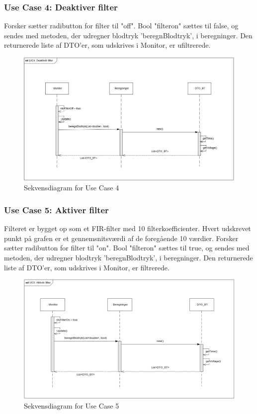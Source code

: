 \subsubsection{Use Case 4: Deaktiver filter}
Forsker sætter radibutton for filter til "off".
Bool "filteron" sættes til false, og sendes med metoden, der udregner blodtryk 'beregnBlodtryk', i beregninger. Den returnerede liste af DTO'er, som udskrives i Monitor, er ufiltrerede.

\begin{figure}[H]
	\centering
	\includegraphics[width=1\textwidth]{Figurer/UC4_SD_SW}
	\caption{Sekvensdiagram for Use Case 4}
\end{figure}

\subsubsection{Use Case 5: Aktiver filter}
Filteret er bygget op som et FIR-filter med 10 filterkoefficienter. Hvert udskrevet punkt på grafen er et gennemsnitsværdi af de foregående 10 værdier.
Forsker sætter radibutton for filter til "on".
Bool "filteron" sættes til true, og sendes med metoden, der udregner blodtryk 'beregnBlodtryk', i beregninger. Den returnerede liste af DTO'er, som udskrives i Monitor, er filtrerede.

\begin{figure}[H]
	\centering
	\includegraphics[width=1\textwidth]{Figurer/UC5_SD_SW}
	\caption{Sekvensdiagram for Use Case 5}
\end{figure}

